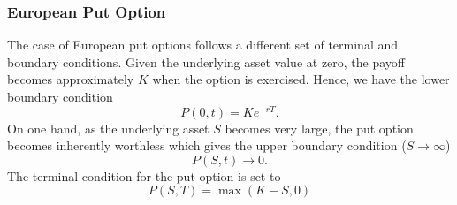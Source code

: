 \subsubsection{European Put Option}
The case of European put options follows a different set of terminal and boundary conditions. Given the underlying asset
value at zero, the payoff becomes approximately $K$ when the option is exercised. Hence, we have
the lower boundary condition
\begin{equation}
    P(0,t) = Ke^{-rT}.
\end{equation}
On one hand, as the underlying asset $S$ becomes very large, the put option becomes inherently worthless which gives 
the upper boundary condition ($S \to \infty$)
\begin{equation}
    P(S,t) \to 0. 
\end{equation}
The terminal condition for the put option is set to
\begin{equation}
    P(S,T) = \max(K-S,0)
\end{equation}


